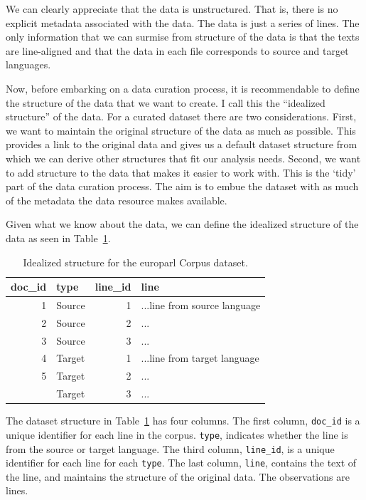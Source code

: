 \documentclass[
  letterpaper,
  DIV=11,
  numbers=noendperiod]{scrreport}
\theoremstyle{definition}
\theoremstyle{remark}
\begin{document}
We can clearly appreciate that the data is unstructured. That is, there
is no explicit metadata associated with the data. The data is just a
series of lines. The only information that we can surmise from structure
of the data is that the texts are line-aligned and that the data in each
file corresponds to source and target languages.

Now, before embarking on a data curation process, it is recommendable to
define the structure of the data that we want to create. I call this the
``idealized structure'' of the data. For a curated dataset there are two
considerations. First, we want to maintain the original structure of the
data as much as possible. This provides a link to the original data and
gives us a default dataset structure from which we can derive other
structures that fit our analysis needs. Second, we want to add structure
to the data that makes it easier to work with. This is the `tidy' part
of the data curation process. The aim is to embue the dataset with as
much of the metadata the data resource makes available.

Given what we know about the data, we can define the idealized structure
of the data as seen in Table~\ref{tbl-cd-europarl-structure-example}.

\hypertarget{tbl-cd-europarl-structure-example}{}
\begin{table}[!h]
\caption{\label{tbl-cd-europarl-structure-example}Idealized structure for the europarl Corpus dataset. }\tabularnewline

\centering
\begin{tabular}{rlrl}
\toprule
doc\_id & type & line\_id & line\\
\midrule
1 & Source & 1 & ...line from source language\\
2 & Source & 2 & ...\\
3 & Source & 3 & ...\\
4 & Target & 1 & ...line from target language\\
5 & Target & 2 & ...\\
\addlinespace
6 & Target & 3 & ...\\
\bottomrule
\end{tabular}
\end{table}

The dataset structure in Table~\ref{tbl-cd-europarl-structure-example}
has four columns. The first column, \texttt{doc\_id} is a unique
identifier for each line in the corpus. \texttt{type}, indicates whether
the line is from the source or target language. The third column,
\texttt{line\_id}, is a unique identifier for each line for each
\texttt{type}. The last column, \texttt{line}, contains the text of the
line, and maintains the structure of the original data. The observations
are lines.
\end{document}

